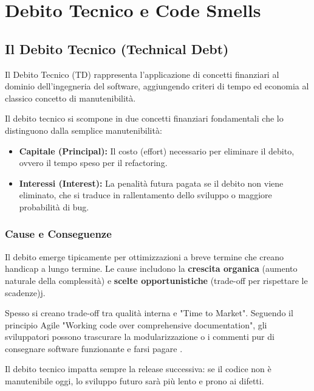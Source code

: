 \chapter{Debito Tecnico e Code Smells}

\section{Il Debito Tecnico (Technical Debt)}
Il Debito Tecnico (TD) rappresenta l'applicazione di concetti finanziari al dominio dell'ingegneria del software, aggiungendo criteri di tempo ed economia al classico concetto di manutenibilità.

\begin{notaesame}
Il debito tecnico si scompone in due concetti finanziari fondamentali che lo distinguono dalla semplice manutenibilità:
\begin{itemize}
    \item \textbf{Capitale (Principal):} Il costo (effort) necessario per eliminare il debito, ovvero il tempo speso per il refactoring.
    \item \textbf{Interessi (Interest):} La penalità futura pagata se il debito non viene eliminato, che si traduce in rallentamento dello sviluppo o maggiore probabilità di bug.
\end{itemize}
\end{notaesame}

\subsection{Cause e Conseguenze}
Il debito emerge tipicamente per ottimizzazioni a breve termine che creano handicap a lungo termine. Le cause includono la \textbf{crescita organica} (aumento naturale della complessità) e \textbf{scelte opportunistiche} (trade-off per rispettare le scadenze)j.

\begin{notaprof}
Spesso si creano trade-off tra qualità interna e "Time to Market". Seguendo il principio Agile "Working code over comprehensive documentation", gli sviluppatori possono trascurare la modularizzazione o i commenti pur di consegnare software funzionante e farsi pagare .
\end{notaprof}

\begin{notaesame}
Il debito tecnico impatta sempre la release successiva: se il codice non è manutenibile oggi, lo sviluppo futuro sarà più lento e prono ai difetti.
\end{notaesame}

